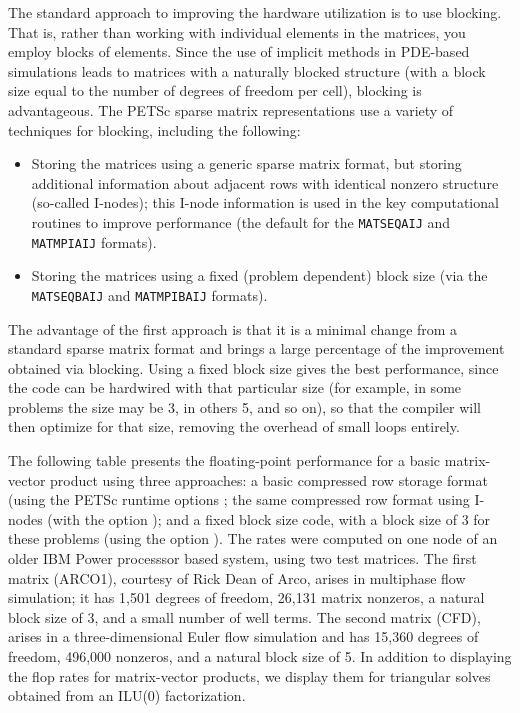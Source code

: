 The standard approach to improving the hardware utilization is to use
blocking. That is, rather than working with individual elements in
the matrices, you employ blocks of elements.  Since the use of
implicit methods in PDE-based simulations leads to matrices with a
naturally blocked structure (with a block size equal to the number of
degrees of freedom per cell), blocking is  advantageous.  The
PETSc sparse matrix representations use a variety
of techniques for blocking, including the following:

\begin{itemize}
\item Storing the matrices using a generic sparse matrix format, but
   storing additional information about adjacent rows with identical
   nonzero structure (so-called I-nodes); this I-node information is
   used in the key computational routines to improve performance
    (the default for the \lstinline{MATSEQAIJ} and \lstinline{MATMPIAIJ} formats).
\item Storing the matrices using a fixed (problem dependent) block size
  (via the \lstinline{MATSEQBAIJ} and \lstinline{MATMPIBAIJ} formats).
\end{itemize}

The advantage of the first approach is that it is a minimal change
from a standard sparse matrix format and brings a large percentage of the
improvement obtained via blocking.  Using a fixed block size gives
the best performance, since the code can be hardwired with that
particular size (for example, in some problems the size may be 3, in
others 5, and so on), so that the compiler will then optimize for that
size, removing the overhead of small loops entirely.

The following table presents the floating-point performance
for a basic matrix-vector product using  three approaches: a basic
compressed row storage format (using the PETSc runtime options
; the same compressed row format using
I-nodes (with the option ); and a fixed block size code,
with a block size of 3 for these problems (using the option
). The rates were computed on one
node of an older IBM Power processsor based system, using two test matrices.  The first matrix
(ARCO1), courtesy of Rick Dean of Arco, arises in multiphase flow
simulation; it has 1,501 degrees of freedom, 26,131 matrix nonzeros,
 a natural block size of 3, and a small number of well terms. The
second matrix (CFD), arises in a three-dimensional Euler flow
simulation and has 15,360 degrees of freedom, 496,000 nonzeros, and a
natural block size of 5. In addition to displaying the flop rates for
matrix-vector products, we display them for triangular solves
obtained from an ILU(0) factorization.

